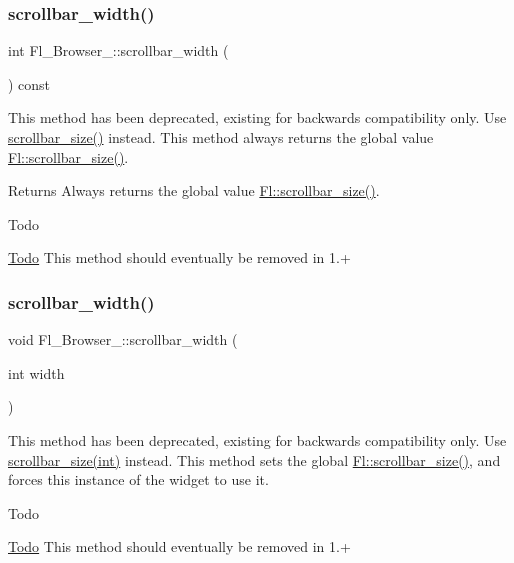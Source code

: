\subsubsection{\texorpdfstring{scrollbar\+\_\+width()}{scrollbar\_width()}\hspace{0.1cm}{\footnotesize\ttfamily [1/2]}}
{\footnotesize\ttfamily int Fl\+\_\+\+Browser\+\_\+\+::scrollbar\+\_\+width (\begin{DoxyParamCaption}{ }\end{DoxyParamCaption}) const\hspace{0.3cm}{\ttfamily [inline]}}

This method has been deprecated, existing for backwards compatibility only. Use \hyperlink{class_fl___browser___a89f6b1be07fc063bf8a8d83cb39d5fa0}{scrollbar\+\_\+size()} instead. This method always returns the global value \hyperlink{class_fl_ae861b8bd4f2d4dcbec7be697e8b4b80e}{Fl\+::scrollbar\+\_\+size()}. \begin{DoxyReturn}{Returns}
Always returns the global value \hyperlink{class_fl_ae861b8bd4f2d4dcbec7be697e8b4b80e}{Fl\+::scrollbar\+\_\+size()}. 
\end{DoxyReturn}
\begin{DoxyRefDesc}{Todo}
\item[\hyperlink{todo__todo000006}{Todo}]This method should eventually be removed in 1.+ \end{DoxyRefDesc}
\mbox{\label{class_fl___browser___a4d59d5c7d78393a7a5d5bfaa01694580}} 
\subsubsection{\texorpdfstring{scrollbar\+\_\+width()}{scrollbar\_width()}\hspace{0.1cm}{\footnotesize\ttfamily [2/2]}}
{\footnotesize\ttfamily void Fl\+\_\+\+Browser\+\_\+\+::scrollbar\+\_\+width (\begin{DoxyParamCaption}\item[{int}]{width }\end{DoxyParamCaption})\hspace{0.3cm}{\ttfamily [inline]}}

This method has been deprecated, existing for backwards compatibility only. Use \hyperlink{class_fl___browser___a6743b9c1513c68e82543530154cadf57}{scrollbar\+\_\+size(int)} instead. This method sets the global \hyperlink{class_fl_ae861b8bd4f2d4dcbec7be697e8b4b80e}{Fl\+::scrollbar\+\_\+size()}, and forces this instance of the widget to use it. \begin{DoxyRefDesc}{Todo}
\item[\hyperlink{todo__todo000007}{Todo}]This method should eventually be removed in 1.+ \end{DoxyRefDesc}
\mbox{\label{class_fl___browser___af3f96e34d2283d2e854b53335e6ee85a}} 

